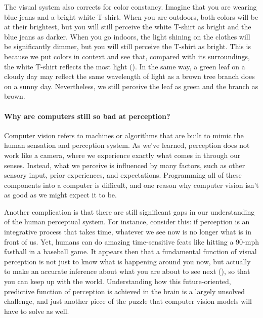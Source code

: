 \documentclass[
]{krantz}
\begin{document}
The visual system also corrects for color constancy. Imagine that you are wearing blue jeans and a bright white T-shirt. When you are outdoors, both colors will be at their brightest, but you will still perceive the white T-shirt as bright and the blue jeans as darker. When you go indoors, the light shining on the clothes will be significantly dimmer, but you will still perceive the T-shirt as bright. This is because we put colors in context and see that, compared with its surroundings, the white T-shirt reflects the most light (). In the same way, a green leaf on a cloudy day may reflect the same wavelength of light as a brown tree branch does on a sunny day. Nevertheless, we still perceive the leaf as green and the branch as brown.

\paragraph*{Why are computers still so bad at perception?}\label{why-are-computers-still-so-bad-at-perception}

\hyperref[computer-vision]{Computer vision} refers to machines or algorithms that are built to mimic the human sensation and perception system. As we've learned, perception does not work like a camera, where we experience exactly what comes in through our senses. Instead, what we perceive is influenced by many factors, such as other sensory input, prior experiences, and expectations. Programming all of these components into a computer is difficult, and one reason why computer vision isn't as good as we might expect it to be.

Another complication is that there are still significant gaps in our understanding of the human perceptual system. For instance, consider this: if perception is an integrative process that takes time, whatever we see now is no longer what is in front of us. Yet, humans can do amazing time-sensitive feats like hitting a 90-mph fastball in a baseball game. It appears then that a fundamental function of visual perception is not just to know what is happening around you now, but actually to make an accurate inference about what you are about to see next (), so that you can keep up with the world. Understanding how this future-oriented, predictive function of perception is achieved in the brain is a largely unsolved challenge, and just another piece of the puzzle that computer vision models will have to solve as well.
\end{document}
